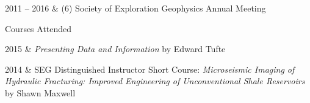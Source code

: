 \documentclass[oneside]{cv}
\newcommand{\subheading}[1]{
    \vspace{0.4cm}
    {\HelveticaNeueUltraLight\fontsize{14pt}{0}\selectfont #1}\\
    \vspace{-0.1cm}
}
\begin{document}
\begin{entryright}
    2011 -- 2016 & (6) Society of Exploration Geophysics Annual Meeting
\end{entryright}



\subheading{Courses Attended}

\begin{entryright}
    2015 & \emph{Presenting Data and Information} by Edward Tufte
\end{entryright}

\begin{entryright}
    2014 & SEG Distinguished Instructor Short Course: \emph{Microseismic Imaging of Hydraulic Fracturing: Improved Engineering of Unconventional Shale Reservoirs} by Shawn Maxwell
\end{entryright}


% 
\end{document}
